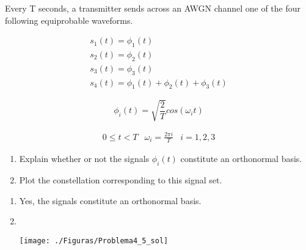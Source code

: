 \documentclass[idioma,boletin]{uah}
\begin{document}
{

Every T seconds, a transmitter sends across an AWGN channel one of the four following equiprobable waveforms.
	
	\begin{displaymath}
		\begin{array}{l}
			s_1 (t)=\phi_1 (t) \\
			s_2 (t)=\phi_2 (t) \\
			s_3 (t)=\phi_3 (t) \\
			s_4 (t)=\phi_1 (t)+\phi_2 (t)+\phi_3 (t) 
		\end{array}
	\end{displaymath}

	\begin{displaymath}
		\phi_i(t) = \sqrt{\frac{2}{T}} cos(\omega_i t) 
	\end{displaymath}
	
	\begin{displaymath}
		\begin{array}{lll}
			0\leq t<T & \omega_i = \frac{2\pi i}{T} & i=1,2,3
		\end{array}
	\end{displaymath}
	
	\begin{enumerate}
		\item Explain whether or not the signals $\phi_i(t)$ constitute an orthonormal basis.
		\item Plot the constellation corresponding to this signal set.
	\end{enumerate}
}
{
\begin{enumerate}
	\item Yes, the signals constitute an orthonormal basis.
	\item \
	{\begin{figure*}[h!]\centering\texttt{[image: ./Figuras/Problema4\_5\_sol]}\end{figure*}}
\end{enumerate}
}

\newpage
\end{document}
